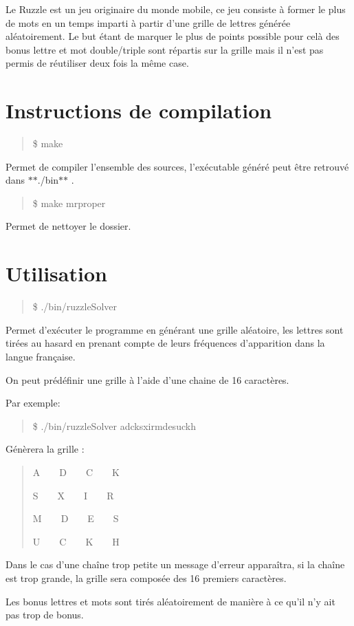 Le Ruzzle est un jeu originaire du monde mobile, ce jeu consiste à former le plus de mots en un temps imparti à partir d'une grille de lettres générée aléatoirement. Le but étant de marquer le plus de points possible pour celà des bonus lettre et mot double/triple sont répartis sur la grille mais il n'est pas permis de réutiliser deux fois la même case.

\section*{Instructions de compilation}

\begin{quote}
\$ make \end{quote}


Permet de compiler l'ensemble des sources, l'exécutable généré peut être retrouvé dans $\ast$$\ast$./bin$\ast$$\ast$ .

\begin{quote}
\$ make mrproper \end{quote}


Permet de nettoyer le dossier.

\section*{Utilisation}

\begin{quote}
\$ ./bin/ruzzle\+Solver \end{quote}


Permet d'exécuter le programme en générant une grille aléatoire, les lettres sont tirées au hasard en prenant compte de leurs fréquences d'apparition dans la langue française.

On peut prédéfinir une grille à l'aide d'une chaine de 16 caractères.

Par exemple\+:

\begin{quote}
\$ ./bin/ruzzle\+Solver adcksxirmdesuckh \end{quote}


Génèrera la grille \+:

\begin{quote}
A~~~~D~~~~C~~~~K

S~~~~X~~~~I~~~~R

M~~~~D~~~~E~~~~S

U~~~~C~~~~K~~~~H

\end{quote}


Dans le cas d'une chaîne trop petite un message d'erreur apparaîtra, si la chaîne est trop grande, la grille sera composée des 16 premiers caractères.

Les bonus lettres et mots sont tirés aléatoirement de manière à ce qu'il n'y ait pas trop de bonus. 